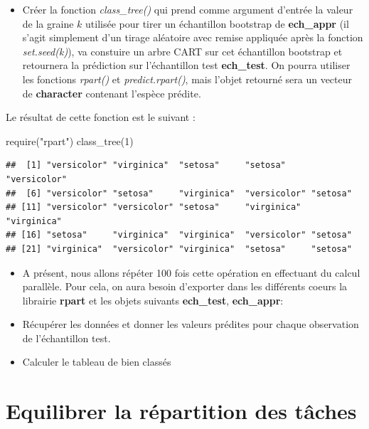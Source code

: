 \documentclass[
]{book}
\newenvironment{Shaded}{\begin{snugshade}}{\end{snugshade}}
\newcommand{\DecValTok}[1]{\textcolor[rgb]{0.00,0.00,0.81}{#1}}
\newcommand{\FunctionTok}[1]{\textcolor[rgb]{0.00,0.00,0.00}{#1}}
\newcommand{\NormalTok}[1]{#1}
\newcommand{\StringTok}[1]{\textcolor[rgb]{0.31,0.60,0.02}{#1}}
\providecommand{\tightlist}{%
  \setlength{\itemsep}{0pt}\setlength{\parskip}{0pt}}
\theoremstyle{definition}
\theoremstyle{definition}
\theoremstyle{definition}
\theoremstyle{definition}
\theoremstyle{remark}
\begin{document}
\begin{itemize}
\tightlist
\item
  Créer la fonction \emph{class\_tree()} qui prend comme argument d'entrée la valeur de la graine \(k\) utilisée pour tirer un échantillon bootstrap de \textbf{ech\_appr} (il s'agit simplement d'un tirage aléatoire avec remise appliquée après la fonction \emph{set.seed(k)}), va constuire un arbre CART sur cet échantillon bootstrap et retournera la prédiction sur l'échantillon test \textbf{ech\_test}. On pourra utiliser les fonctions \emph{rpart()} et \emph{predict.rpart()}, mais l'objet retourné sera un vecteur de \textbf{character} contenant l'espèce prédite.
\end{itemize}

Le résultat de cette fonction est le suivant :

\begin{Shaded}
\begin{Highlighting}[]
\FunctionTok{require}\NormalTok{(}\StringTok{"rpart"}\NormalTok{)}
\FunctionTok{class\_tree}\NormalTok{(}\DecValTok{1}\NormalTok{)}
\end{Highlighting}
\end{Shaded}

\begin{verbatim}
##  [1] "versicolor" "virginica"  "setosa"     "setosa"     "versicolor"
##  [6] "versicolor" "setosa"     "virginica"  "versicolor" "setosa"    
## [11] "versicolor" "versicolor" "setosa"     "virginica"  "virginica" 
## [16] "setosa"     "virginica"  "virginica"  "versicolor" "setosa"    
## [21] "virginica"  "versicolor" "virginica"  "setosa"     "setosa"
\end{verbatim}

\begin{itemize}
\item
  A présent, nous allons répéter 100 fois cette opération en effectuant du calcul parallèle. Pour cela, on aura besoin d'exporter dans les différents coeurs la librairie \textbf{rpart} et les objets suivants \textbf{ech\_test}, \textbf{ech\_appr}:
\item
  Récupérer les données et donner les valeurs prédites pour chaque observation de l'échantillon test.
\item
  Calculer le tableau de bien classés
\end{itemize}

\hypertarget{equilibrer-la-ruxe9partition-des-tuxe2ches}{%
\section{Equilibrer la répartition des tâches}\label{equilibrer-la-ruxe9partition-des-tuxe2ches}}
\end{document}
